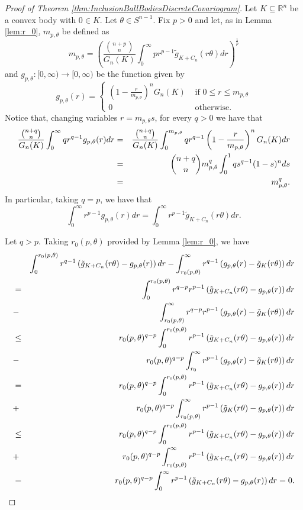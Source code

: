 \documentclass[10pt]{amsart}
\def\R{\mathbb{R}}
\numberwithin{equation}{section}
\begin{document}
\begin{proof}[Proof of Theorem \ref{thm:InclusionBallBodiesDiscreteCovariogram}]
Let $K\subseteq\R^n$ be a convex body with $0\in K$. Let $\theta\in S^{n-1}$. Fix $p>0$ and let, as in Lemma \ref{lem:r_0}, $m_{p,\theta}$ be defined as
$$
m_{p,\theta}=\left(\frac{{{n+p}\choose{n}}}{G_n(K)}\int_0^\infty pr^{p-1}\tilde{g}_{K+C_n}(r\theta)dr\right)^\frac{1}{p}
$$
and $g_{p,\theta}:[0,\infty)\to[0,\infty)$ be the function given by
$$
g_{p,\theta}(r)=\begin{cases}
\left(1-\frac{r}{m_{p,\theta}}\right)^nG_n(K)&\textrm{ if }0\leq r\leq m_{p,\theta}\\
0 &\textrm{ otherwise}.
\end{cases}
$$
Notice that, changing variables $r=m_{p,\theta}s$, for every $q>0$ we have that
\begin{eqnarray*}
\frac{{{n+q}\choose{n}}}{G_n(K)}\int_0^\infty qr^{q-1}g_{p,\theta}(r)dr&=&\frac{{{n+q}\choose{n}}}{G_n(K)}\int_0^{m_{p,\theta}} qr^{q-1}\left(1-\frac{r}{m_{p,\theta}}\right)^nG_n(K)dr\cr
&=&{{n+q}\choose{n}}m_{p,\theta}^q\int_0^1 qs^{q-1}(1-s)^nds\cr
&=&m_{p,\theta}^q.
\end{eqnarray*}
In particular, taking $q=p$, we have that
$$
\int_0^\infty r^{p-1}g_{p,\theta}(r)dr=\int_0^\infty r^{p-1}\tilde{g}_{K+C_n}(r\theta)dr.
$$

Let $q>p$. Taking $r_0(p,\theta)$ provided by Lemma \ref{lem:r_0}, we have
\begin{eqnarray*}
&&\int_0^{r_0(p,\theta)}r^{q-1}\left(\tilde{g}_{K+C_n}(r\theta)-g_{p,\theta}(r)\right)dr-\int_{r_0(p,\theta)}^\infty r^{q-1}\left(g_{p,\theta}(r)-\tilde{g}_K(r\theta)\right)dr\cr
&=&\int_0^{r_0(p,\theta)}r^{q-p}r^{p-1}\left(\tilde{g}_{K+C_n}(r\theta)-g_{p,\theta}(r)\right)dr\cr
&-&\int_{r_0(p,\theta)}^\infty r^{q-p}r^{p-1}\left(g_{p,\theta}(r)-\tilde{g}_K(r\theta)\right)dr\cr
&\leq&r_0(p,\theta)^{q-p}\int_0^{r_0(p,\theta)}r^{p-1}\left(\tilde{g}_{K+C_n}(r\theta)-g_{p,\theta}(r)\right)dr\cr
&-&r_0(p,\theta)^{q-p}\int_{r_0}^\infty r^{p-1}\left(g_{p,\theta}(r)-\tilde{g}_K(r\theta)\right)dr\cr
&=&r_0(p,\theta)^{q-p}\int_0^{r_0(p,\theta)}r^{p-1}\left(\tilde{g}_{K+C_n}(r\theta)-g_{p,\theta}(r)\right)dr\cr
&+&r_0(p,\theta)^{q-p}\int_{r_0(p,\theta)}^\infty r^{p-1}\left(\tilde{g}_K(r\theta)-g_{p,\theta}(r)\right)dr\cr
&\leq&r_0(p,\theta)^{q-p}\int_0^{r_0(p,\theta)}r^{p-1}\left(\tilde{g}_{K+C_n}(r\theta)-g_{p,\theta}(r)\right)dr\cr
&+&r_0(p,\theta)^{q-p}\int_{r_0(p,\theta)}^\infty r^{p-1}\left(\tilde{g}_{K+C_n}(r\theta)-g_{p,\theta}(r)\right)dr\cr
&=&r_0(p,\theta)^{q-p}\int_0^{\infty}r^{p-1}\left(\tilde{g}_{K+C_n}(r\theta)-g_{p,\theta}(r)\right)dr=0.
\end{eqnarray*}


\end{proof}
\end{document}
